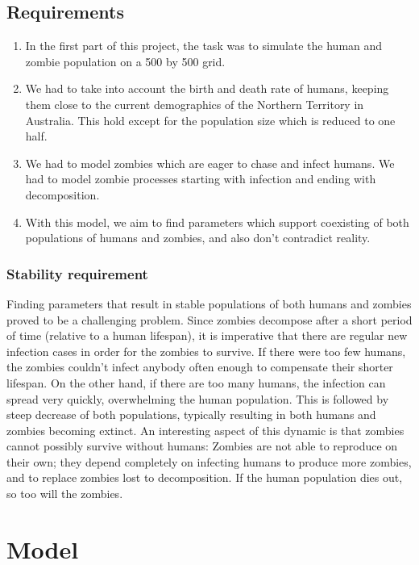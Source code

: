 \documentclass[a4paper]{article}
\begin{document}
\subsection{Requirements}

\begin{enumerate}
\item In the first part of this project, the task was to simulate the human and zombie population on a 500 by 500 grid.
\item We had to take into account the birth and death rate of humans, keeping them close to the current demographics of the Northern Territory in Australia.
    This hold except for the population size which is reduced to one half. \cite{project}
\item We had to model zombies which are eager to chase and infect humans.
    We had to model zombie processes starting with infection and ending with decomposition.
\item With this model, we aim to find parameters which support coexisting of both populations of humans and zombies, and also don't contradict reality.
\end{enumerate}

\subsubsection{Stability requirement}

Finding parameters that result in stable populations of both humans and zombies proved to be a challenging problem.
Since zombies decompose after a short period of time (relative to a human lifespan), it is imperative that there are regular new infection cases in order for the zombies to survive.
If there were too few humans, the zombies couldn't infect anybody often enough to compensate their shorter lifespan.
On the other hand, if there are too many humans, the infection can spread very quickly, overwhelming the human population. 
This is followed by steep decrease of both populations, typically resulting in both humans and zombies becoming extinct.
An interesting aspect of this dynamic is that zombies cannot possibly survive without humans: Zombies are not able to reproduce on their own; they depend completely on infecting humans to produce more zombies, and to replace zombies lost to decomposition. 
If the human population dies out, so too will the zombies.

\section{Model} %
\end{document}
